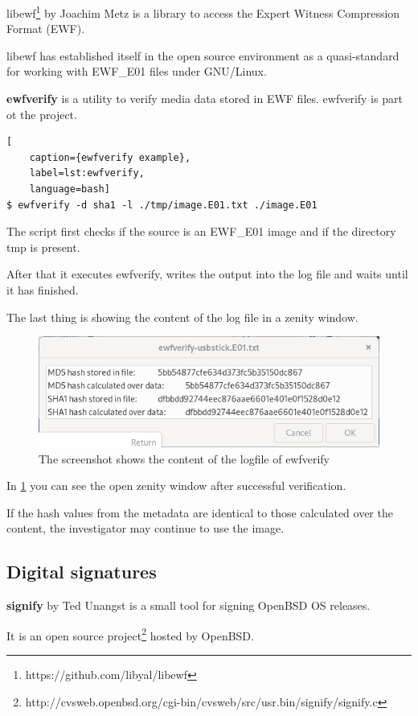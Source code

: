 libewf\footnote{https://github.com/libyal/libewf} by Joachim Metz is a library to access the Expert Witness Compression Format (EWF).

libewf has established itself in the open source environment as a quasi-standard for working with EWF\_E01 files under GNU/Linux.

\textbf{ewfverify} is a utility to verify media data stored in EWF files. ewfverify is part ot the project.

\begin{lstlisting}[
    caption={ewfverify example},
    label=lst:ewfverify,
    language=bash]
$ ewfverify -d sha1 -l ./tmp/image.E01.txt ./image.E01
\end{lstlisting}

The script first checks if the source is an EWF\_E01 image and if the directory tmp is present.

After that it executes ewfverify, writes the output into the log file and waits until it has finished.

The last thing is showing the content of the log file in a zenity window.

\begin{figure}[htbp]  %
  \centering
  \includegraphics[width=.5\textwidth]{figures/ewfverify.png}
  \caption[ewfverify logfile]{The screenshot shows the content of the logfile of ewfverify}
  \label{fig:ewfverifylog}
\end{figure}

In \cref{fig:ewfverifylog} you can see the open zenity window after successful verification.

If the hash values from the metadata are identical to those calculated over the content, the investigator may continue to use the image.

\subsection{Digital signatures}

\textbf{signify} by Ted Unangst is a small tool for signing OpenBSD OS releases.

It is an open source project\footnote{http://cvsweb.openbsd.org/cgi-bin/cvsweb/src/usr.bin/signify/signify.c} hosted by OpenBSD.

